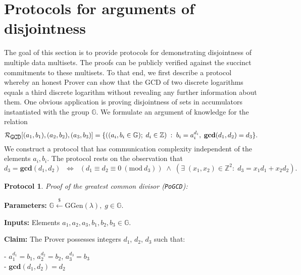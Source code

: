 \documentclass[11pt, lettersize, notitlepage, leqno, footskip=0.6cm]{article}
\newcommand{\bz}{\mathbb Z}
\newcommand{\LRA}{\Longleftrightarrow}
\newcommand{\mc}{\mathcal}
\newcommand{\mb}{\mathbb}
\newcommand{\mbf}{\mathbf}
\newcommand{\mr}{\mathrm}
\newcommand{\lamb}{\lambda}
\newcommand{\vs}{\vspace{-0.15cm}}
\newcommand{\Mod}[1]{\ (\mathrm{mod}\ #1)}
\newcommand{\GCD}{\mbf{gcd}}
\newtheorem{Prot}[Thm]{Protocol}
\numberwithin{equation}{section}
\begin{document}
\section{\fontsize{12}{12}\selectfont Protocols for arguments of disjointness}

The goal of this section is to provide protocols for demonstrating disjointness of multiple data multisets. The proofs can be publicly verified against the succinct commitments to these multisets. To that end, we first describe a protocol whereby an honest Prover can show that the GCD of two discrete logarithms equals a third discrete logarithm without revealing any further information about them. One obvious application is proving disjointness of sets in accumulators instantiated with the group $\mb{G}$. We formulate an argument of knowledge for the relation \vspace{-0.15cm} $$\mc{R}_{{\protect\verb|GCD|}}[(a_1,b_1),(a_2,b_2),(a_3,b_3)] = \{((a_i, b_i\in\mb{G});\;d_i\in\bz)\;:\; b_i = a_i^{d_i},\;\GCD(d_1,d_2)=d_3  \} .$$ We construct a protocol that has communication complexity independent of the elements $a_i, b_i$. The protocol rests on the observation that \vs $$d_3 = \GCD(d_1, d_2)\;\; \LRA \;\;(d_1\equiv d_2\equiv 0 \Mod{d_3})\;\wedge \; \left(\exists \; (x_1,x_2)\in \bz^2:\; d_3 = x_1d_1+x_2d_2  \right).$$
 

\begin{Prot} \normalfont \textit{Proof of the greatest common divisor} (\verb|PoGCD|):\end{Prot} \vspace{-0.3cm}

\noindent \textbf{Parameters:} $\mb{G}\xleftarrow{\$} \mr{GGen}(\lamb), \; g\in \mb{G}$.

\noindent \textbf{Inputs:} Elements $a_1, a_2, a_3, b_1, b_2, b_3 \in \mb{G}$.

\noindent \textbf{Claim:} The Prover possesses integers $d_1$, $d_2$, $d_3$ such that:

\noindent - $a_1^{d_1} = b_1$, $a_2^{d_2} = b_2$, $a_3^{d_3} = b_3$\\
\noindent - $\GCD(d_1, d_2) = d_2$
 
\end{document}
